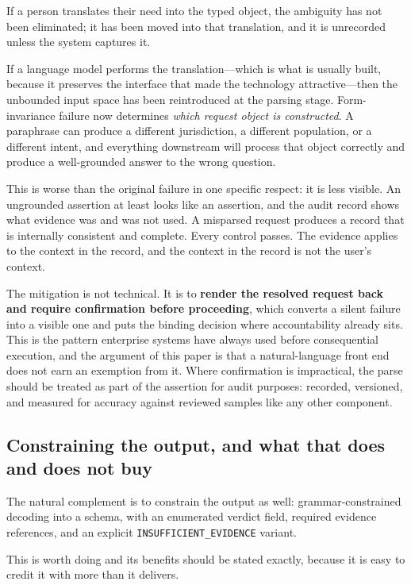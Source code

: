 \documentclass[11pt]{article}
\theoremstyle{plain}
\theoremstyle{definition}
\begin{document}
If a person translates their need into the typed object, the ambiguity has not been
eliminated; it has been moved into that translation, and it is unrecorded unless the
system captures it.

If a language model performs the translation---which is what is usually built,
because it preserves the interface that made the technology attractive---then the
unbounded input space has been reintroduced at the parsing stage. Form-invariance
failure now determines \emph{which request object is constructed}. A paraphrase can
produce a different jurisdiction, a different population, or a different intent, and
everything downstream will process that object correctly and produce a well-grounded
answer to the wrong question.

This is worse than the original failure in one specific respect: it is less visible.
An ungrounded assertion at least looks like an assertion, and the audit record shows
what evidence was and was not used. A misparsed request produces a record that is
internally consistent and complete. Every control passes. The evidence applies to the
context in the record, and the context in the record is not the user's context.

The mitigation is not technical. It is to \textbf{render the resolved request back and
require confirmation before proceeding}, which converts a silent failure into a
visible one and puts the binding decision where accountability already sits. This is
the pattern enterprise systems have always used before consequential execution, and
the argument of this paper is that a natural-language front end does not earn an
exemption from it. Where confirmation is impractical, the parse should be treated as
part of the assertion for audit purposes: recorded, versioned, and measured for
accuracy against reviewed samples like any other component.

\subsection{Constraining the output, and what that does and does not buy}
\label{sec:constrained-output}

The natural complement is to constrain the output as well: grammar-constrained
decoding into a schema, with an enumerated verdict field, required evidence
references, and an explicit \texttt{INSUFFICIENT\_EVIDENCE} variant.

This is worth doing and its benefits should be stated exactly, because it is easy to
credit it with more than it delivers.
\end{document}
